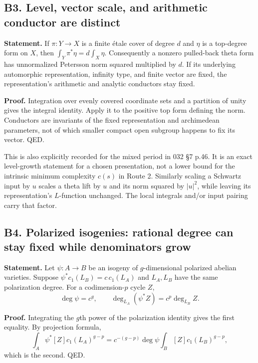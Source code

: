 \documentclass[11pt,a4paper]{article}
\theoremstyle{definition}
\begin{document}
\subsection{B3. Level, vector scale, and arithmetic conductor are distinct}\label{b3.-level-vector-scale-and-arithmetic-conductor-are-distinct}

\textbf{Statement.} If \(\pi:Y\to X\) is a finite étale cover of degree \(d\) and \(\eta\) is a top-degree form on \(X\), then \(\int_Y\pi^*\eta=d\int_X\eta\). Consequently a nonzero pulled-back theta form has unnormalized Petersson norm squared multiplied by \(d\). If its underlying automorphic representation, infinity type, and finite vector are fixed, the representation's arithmetic and analytic conductors stay fixed.

\textbf{Proof.} Integration over evenly covered coordinate sets and a partition of unity gives the integral identity. Apply it to the positive top form defining the norm. Conductors are invariants of the fixed representation and archimedean parameters, not of which smaller compact open subgroup happens to fix its vector. QED.

This is also explicitly recorded for the mixed period in 032 §7 p.46. It is an exact level-growth statement for a chosen presentation, not a lower bound for the intrinsic minimum complexity \(c(s)\) in Route 2. Similarly scaling a Schwartz input by \(u\) scales a theta lift by \(u\) and its norm squared by \(|u|^2\), while leaving its representation's \(L\)-function unchanged. The local integrals and/or input pairing carry that factor.

\subsection{B4. Polarized isogenies: rational degree can stay fixed while denominators grow}\label{b4.-polarized-isogenies-rational-degree-can-stay-fixed-while-denominators-grow}

\textbf{Statement.} Let \(\psi:A\to B\) be an isogeny of \(g\)-dimensional polarized abelian varieties. Suppose \(\psi^*c_1(L_B)=c\,c_1(L_A)\) and \(L_A,L_B\) have the same polarization degree. For a codimension-\(p\) cycle \(Z\), \[
 \deg\psi=c^g,\qquad
 \deg_{L_A}(\psi^*Z)=c^p\deg_{L_B}Z.
\]

\textbf{Proof.} Integrating the \(g\)th power of the polarization identity gives the first equality. By projection formula, \[
 \int_A\psi^*[Z]c_1(L_A)^{g-p}
 =c^{-(g-p)}\deg\psi\int_B[Z]c_1(L_B)^{g-p},
\] which is the second. QED.
\end{document}
